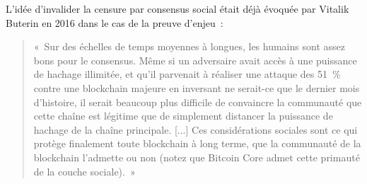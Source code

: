 L'idée d'invalider la censure par consensus social était déjà évoquée par Vitalik Buterin en 2016 dans le cas de la preuve d'enjeu~:

\begin{quote}
«~Sur des échelles de temps moyennes à longues, les humains sont assez bons pour le consensus. Même si un adversaire avait accès à une puissance de hachage illimitée, et qu'il parvenait à réaliser une attaque des 51~\% contre une blockchain majeure en inversant ne serait-ce que le dernier mois d'histoire, il serait beaucoup plus difficile de convaincre la communauté que cette chaîne est légitime que de simplement distancer la puissance de hachage de la chaîne principale. [...] Ces considérations sociales sont ce qui protège finalement toute blockchain à long terme, que la communauté de la blockchain l'admette ou non (notez que Bitcoin Core admet cette primauté de la couche sociale).~»
\end{quote}

%

